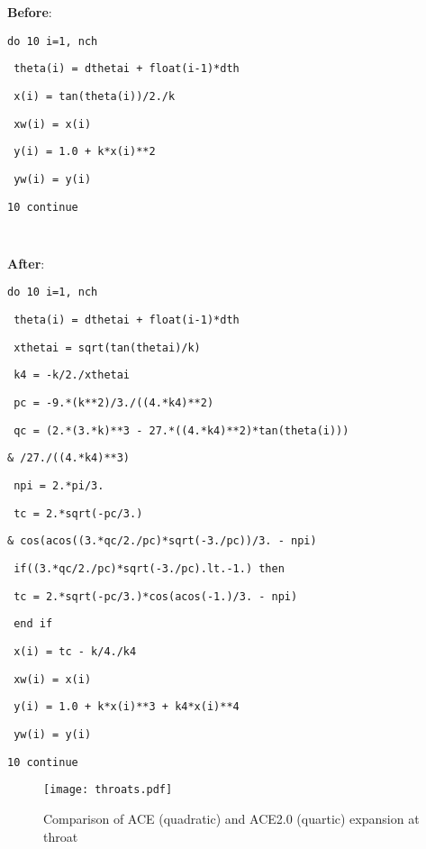 \begin{singlespace}
    \textbf{Before}:

    \texttt{do 10 i=1, nch}

    \texttt{\; theta(i) = dthetai + float(i-1)*dth}

    \texttt{\; x(i) = tan(theta(i))/2./k}

    \texttt{\; xw(i) = x(i)}

    \texttt{\; y(i) = 1.0 + k*x(i)**2}

    \texttt{\; yw(i) = y(i)}

    \texttt{10 continue}

    \texttt{ }
    
    \textbf{After}:

    \texttt{do 10 i=1, nch }

    \texttt{\; theta(i) = dthetai + float(i-1)*dth}

    \texttt{\; xthetai = sqrt(tan(thetai)/k)}

    \texttt{\; k4 = -k/2./xthetai}

    \texttt{\; pc = -9.*(k**2)/3./((4.*k4)**2)}

    \texttt{\; qc = (2.*(3.*k)**3 - 27.*((4.*k4)**2)*tan(theta(i)))}

    \texttt{\& \quad /27./((4.*k4)**3)}

    \texttt{\; npi = 2.*pi/3.}

    \texttt{\; tc = 2.*sqrt(-pc/3.)}

    \texttt{\& \quad *cos(acos((3.*qc/2./pc)*sqrt(-3./pc))/3. - npi)}

    \texttt{\; if((3.*qc/2./pc)*sqrt(-3./pc).lt.-1.) then}

    \texttt{\; \qquad tc = 2.*sqrt(-pc/3.)*cos(acos(-1.)/3. - npi)}

    \texttt{\; end if}

    \texttt{\; x(i) = tc - k/4./k4}

    \texttt{\; xw(i) = x(i)}

    \texttt{\; y(i) = 1.0 + k*x(i)**3 + k4*x(i)**4}

    \texttt{\; yw(i) = y(i)}

    \texttt{10 continue}
\end{singlespace}

\begin{figure}[ht!]
    \centering
    \texttt{[image: throats.pdf]}
    \caption{Comparison of ACE (quadratic) and ACE2.0 (quartic) expansion at throat}
    \label{fig:throats}
\end{figure}

